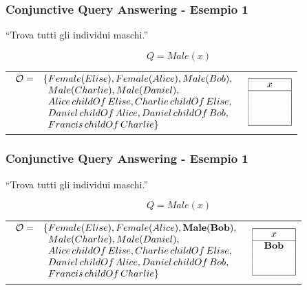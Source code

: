 \documentclass[8pt]{beamer}
\begin{document}
\begin{frame}
\frametitle{Conjunctive Query Answering - Esempio 1}
\begin{center}
``Trova tutti gli individui maschi.'' 
\end{center}
\[
 Q=Male(x)
\]
\vspace{\baselineskip}

\begin{tabular}{lc}
$\begin{array}{cl}
  \Ont  =  &  \{Female(Elise),  Female(Alice), Male(Bob), \\
  &\phantom{\{}Male(Charlie), Male(Daniel), \\
  &\phantom{\{}Alice\,childOf\,Elise, Charlie\,childOf\,Elise, \\
  &\phantom{\{}Daniel\,childOf\,Alice, Daniel\,childOf\,Bob, \\
  &\phantom{\{}Francis\,childOf\,Charlie \}\\
\end{array}$ & 
$\begin{array}{|c|}
  \hline
  x\\
  \hline
  \phantom{Bob}\\
  \phantom{Charlie}\\
  \phantom{Daniel}\\
  \hline
\end{array}$ \\
\end{tabular}
\end{frame}

\begin{frame}
\frametitle{Conjunctive Query Answering - Esempio 1}
\begin{center}
``Trova tutti gli individui maschi.'' 
\end{center}
\[
 Q=Male(x)
\]
\vspace{\baselineskip}

\begin{tabular}{lc}
$\begin{array}{cl}
  \Ont  =  &  \{Female(Elise),  Female(Alice), \mathbf{Male(Bob)}, \\
  &\phantom{\{}Male(Charlie), Male(Daniel), \\
  &\phantom{\{}Alice\,childOf\,Elise, Charlie\,childOf\,Elise, \\
  &\phantom{\{}Daniel\,childOf\,Alice, Daniel\,childOf\,Bob, \\
  &\phantom{\{}Francis\,childOf\,Charlie \}\\
\end{array}$ & 
$\begin{array}{|c|}
  \hline
  x\\
  \hline
  \mathbf{Bob}\\
  \phantom{Charlie}\\
  \phantom{Daniel}\\
  \hline
\end{array}$ \\
\end{tabular}
\end{frame}
\end{document}
